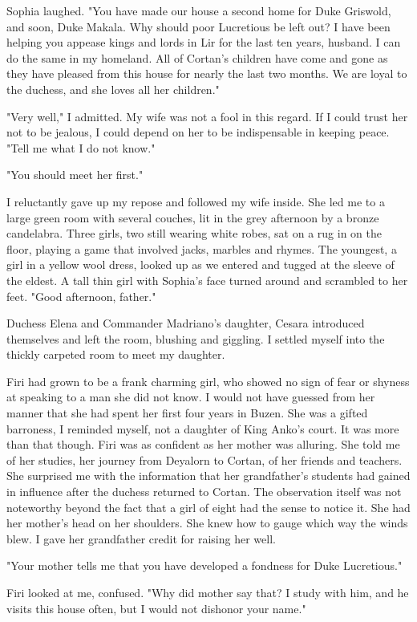 \documentclass{article}
\begin{document}
Sophia laughed. "You have made our house a second home for Duke Griswold, and soon, Duke Makala. Why should poor Lucretious be left out? I have been helping you appease kings and lords in Lir for the last ten years, husband. I can do the same in my homeland. All of Cortan's children have come and gone as they have pleased from this house for nearly the last two months. We are loyal to the duchess, and she loves all her children."

"Very well," I admitted. My wife was not a fool in this regard. If I could trust her not to be jealous, I could depend on her to be indispensable in keeping peace. "Tell me what I do not know."

"You should meet her first." 

I reluctantly gave up my repose and followed my wife inside. She led me to a large green room with several couches, lit in the grey afternoon by a bronze candelabra. Three girls, two still wearing white robes, sat on a rug in on the floor, playing a game that involved jacks, marbles and rhymes. The youngest, a girl in a yellow wool dress, looked up as we entered and tugged at the sleeve of the eldest. A tall thin girl with Sophia's face turned around and scrambled to her feet. "Good afternoon, father."

Duchess Elena and Commander Madriano's daughter, Cesara introduced themselves and left the room, blushing and giggling. I settled myself into the thickly carpeted room to meet my daughter. 

Firi had grown to be a frank charming girl, who showed no sign of fear or shyness at speaking to a man she did not know. I would not have guessed from her manner that she had spent her first four years in Buzen. She was a gifted barroness, I reminded myself, not a daughter of King Anko's court. It was more than that though. Firi was as confident as her mother was alluring. She told me of her studies, her journey from Deyalorn to Cortan, of her friends and teachers. She surprised me with the information that her grandfather's students had gained in influence after the duchess returned to Cortan. The observation itself was not noteworthy beyond the fact that a girl of eight had the sense to notice it. She had her mother's head on her shoulders. She knew how to gauge which way the winds blew. I gave her grandfather credit for raising her well.

"Your mother tells me that you have developed a fondness for Duke Lucretious."

Firi looked at me, confused. "Why did mother say that? I study with him, and he visits this house often, but I would not dishonor your name."
\end{document}
